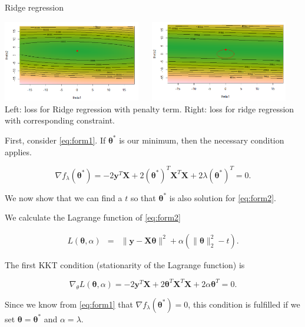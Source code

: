 \documentclass[11pt,compress,t,notes=noshow, xcolor=table]{beamer}
\begin{document}
\begin{vbframe}{Ridge regression}
\begin{center}
\includegraphics[width = 0.45\textwidth]{figure_man/ridge_formulation1.png} ~~ \includegraphics[width = 0.45\textwidth]{figure_man/ridge_formulation2.png} \\
Left: loss for Ridge regression with penalty term. Right: loss for ridge regression with corresponding constraint.
\end{center}


\framebreak

First, consider \eqref{eq:form1}. If $\bm{\theta}^*$ is our minimum, then the necessary condition applies.

$$
\nabla f_\lambda(\bm{\theta}^*) = - 2 \bm{y}^T\mathbf{X} + 2 (\bm{\theta}^*)^T \mathbf{X}^T\mathbf{X} + 2 \lambda (\bm{\theta}^*)^T = 0.
$$

We now show that we can find a $t$ so that $\bm{\theta}^*$ is also solution for \eqref{eq:form2}.

\lz

We calculate the Lagrange function of \eqref{eq:form2}

\vspace*{-0.5cm}
\begin{eqnarray*}
  L(\bm{\theta}, \alpha) &=& \|\bm{y} - \mathbf{X}\bm{\theta}\|^2 + \alpha (\|\bm{\theta}\|^2_2 - t).
\end{eqnarray*}

The first KKT condition (stationarity of the Lagrange function) is

$$
\nabla_\theta L(\bm{\theta}, \alpha)= - 2\bm{y}^T\mathbf{X} + 2 \bm{\theta}^T \mathbf{X}^T\mathbf{X} + 2 \alpha \bm{\theta}^T = 0.
$$

Since we know from \eqref{eq:form1} that $\nabla f_\lambda(\bm{\theta}^*) = 0$, this condition is fulfilled if we set $\bm{\theta} = \bm{\theta}^*$ and $\alpha = \lambda$.


\end{vbframe}
\end{document}
